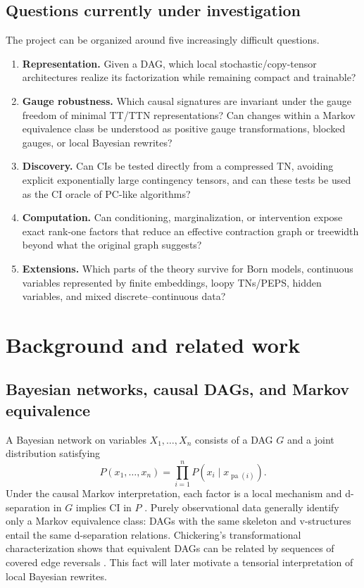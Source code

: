 \documentclass[11pt]{article}
\theoremstyle{remark}
\newcommand{\pa}{\operatorname{pa}}
\begin{document}
\subsection{Questions currently under investigation}

The project can be organized around five increasingly difficult questions.
\begin{enumerate}
\item \textbf{Representation.} Given a DAG, which local stochastic/copy-tensor architectures realize its factorization while remaining compact and trainable?
\item \textbf{Gauge robustness.} Which causal signatures are invariant under the gauge freedom of minimal TT/TTN representations? Can changes within a Markov equivalence class be understood as positive gauge transformations, blocked gauges, or local Bayesian rewrites?
\item \textbf{Discovery.} Can CIs be tested directly from a compressed TN, avoiding explicit exponentially large contingency tensors, and can these tests be used as the CI oracle of PC-like algorithms?
\item \textbf{Computation.} Can conditioning, marginalization, or intervention expose exact rank-one factors that reduce an effective contraction graph or treewidth beyond what the original graph suggests?
\item \textbf{Extensions.} Which parts of the theory survive for Born models, continuous variables represented by finite embeddings, loopy TNs/PEPS, hidden variables, and mixed discrete--continuous data?
\end{enumerate}

\section{Background and related work}
\label{sec:background}

\subsection{Bayesian networks, causal DAGs, and Markov equivalence}

A Bayesian network on variables $X_1,\ldots,X_n$ consists of a DAG $G$ and a joint distribution satisfying
\begin{equation}
P(x_1,\ldots,x_n)=\prod_{i=1}^n P(x_i\mid x_{\pa(i)}).
\label{eq:bn-factorization}
\end{equation}
Under the causal Markov interpretation, each factor is a local mechanism and d-separation in $G$ implies CI in $P$ \cite{pearl2009causality,spirtes2000causation}. Purely observational data generally identify only a Markov equivalence class: DAGs with the same skeleton and v-structures entail the same d-separation relations. Chickering's transformational characterization shows that equivalent DAGs can be related by sequences of covered edge reversals \cite{chickering1995transformational}. This fact will later motivate a tensorial interpretation of local Bayesian rewrites.
\end{document}
